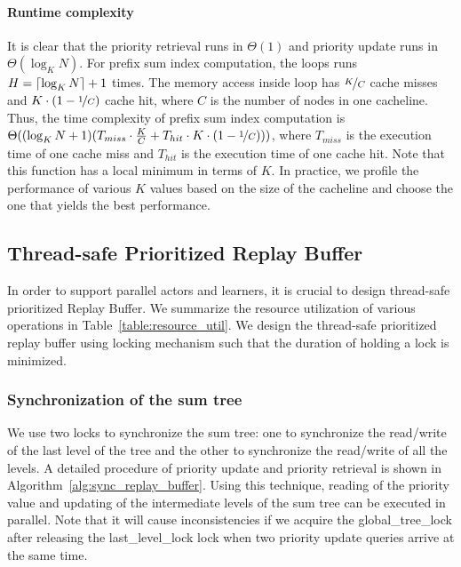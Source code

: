 \paragraph{Runtime complexity}
It is clear that the priority retrieval runs in $\Theta(1)$ and priority update runs in $\Theta(\log_K N)$. For prefix sum index computation, the loops runs $H=\lceil \log_K N \rceil + 1$ times. The memory access inside loop has $\nicefrac{K}{C}$ cache misses and $K\cdot(1-\nicefrac{1}{C})$ cache hit, where $C$ is the number of nodes in one cacheline. Thus, the time complexity of prefix sum index computation is $\Theta((\log_K N+1)(T_{miss}\cdot\frac{K}{C}+T_{hit}\cdot K\cdot(1-\nicefrac{1}{C})))$, where $T_{miss}$ is the execution time of one cache miss and $T_{hit}$ is the execution time of one cache hit. Note that this function has a local minimum in terms of $K$. In practice, we profile the performance of various $K$ values based on the size of the cacheline and choose the one that yields the best performance.

\subsection{Thread-safe Prioritized Replay Buffer}\label{sec:thread_safe_prb}
In order to support parallel actors and learners, it is crucial to design thread-safe prioritized Replay Buffer. We summarize the resource utilization of various operations in Table~\ref{table:resource_util}. We design the thread-safe prioritized replay buffer using locking mechanism such that the duration of holding a lock is minimized. 

\subsubsection{Synchronization of the sum tree}
We use two locks to synchronize the sum tree: one to synchronize the read/write of the last level of the tree and the other to synchronize the read/write of all the levels. A detailed procedure of priority update and priority retrieval is shown in Algorithm~\ref{alg:sync_replay_buffer}. Using this technique, reading of the priority value and updating of the intermediate levels of the sum tree can be executed in parallel. Note that it will cause inconsistencies if we acquire the global\_tree\_lock after releasing the last\_level\_lock lock when two priority update queries arrive at the same time.

